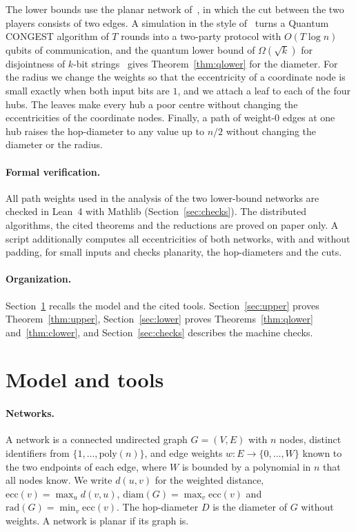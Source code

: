\documentclass[11pt]{article}
\theoremstyle{definition}
\theoremstyle{remark}
\newcommand{\ecc}{\mathrm{ecc}}
\newcommand{\diam}{\mathrm{diam}}
\newcommand{\rad}{\mathrm{rad}}
\begin{document}
The lower bounds use the planar network of~\cite{ACK20}, in which the cut between the two players consists of two edges. A simulation in the style of~\cite{LM18} turns a Quantum CONGEST algorithm of $T$ rounds into a two-party protocol with $O(T\log n)$ qubits of communication, and the quantum lower bound of $\Omega(\sqrt k)$ for disjointness of $k$-bit strings~\cite{Raz03} gives Theorem~\ref{thm:qlower} for the diameter. For the radius we change the weights so that the eccentricity of a coordinate node is small exactly when both input bits are $1$, and we attach a leaf to each of the four hubs. The leaves make every hub a poor centre without changing the eccentricities of the coordinate nodes. Finally, a path of weight-$0$ edges at one hub raises the hop-diameter to any value up to $n/2$ without changing the diameter or the radius.

\paragraph{Formal verification.} All path weights used in the analysis of the two lower-bound networks are checked in Lean~4 with Mathlib (Section~\ref{sec:checks}). The distributed algorithms, the cited theorems and the reductions are proved on paper only. A script additionally computes all eccentricities of both networks, with and without padding, for small inputs and checks planarity, the hop-diameters and the cuts.

\paragraph{Organization.} Section~\ref{sec:prelim} recalls the model and the cited tools. Section~\ref{sec:upper} proves Theorem~\ref{thm:upper}, Section~\ref{sec:lower} proves Theorems~\ref{thm:qlower} and~\ref{thm:clower}, and Section~\ref{sec:checks} describes the machine checks.

\section{Model and tools}\label{sec:prelim}

\paragraph{Networks.} A network is a connected undirected graph $G=(V,E)$ with $n$ nodes, distinct identifiers from $\{1,\dots,\mathrm{poly}(n)\}$, and edge weights $w\colon E\to\{0,\dots,W\}$ known to the two endpoints of each edge, where $W$ is bounded by a polynomial in $n$ that all nodes know. We write $d(u,v)$ for the weighted distance, $\ecc(v)=\max_u d(v,u)$, $\diam(G)=\max_v \ecc(v)$ and $\rad(G)=\min_v\ecc(v)$. The hop-diameter $D$ is the diameter of $G$ without weights. A network is planar if its graph is.
\end{document}
